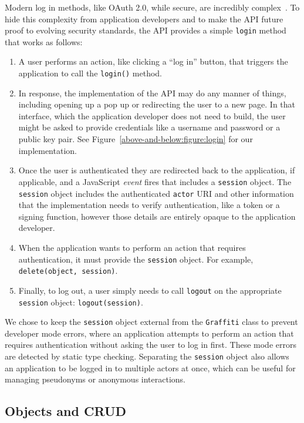 Modern log in methods, like OAuth 2.0, while secure, are incredibly complex~\cite{oauth}.
To hide this complexity from application developers and to make the API future proof
to evolving security standards, the API provides a simple \texttt{login} method that works as follows:

\begin{enumerate}
\item
A user performs an action, like clicking a ``log in'' button, that triggers
the application to call the \texttt{login()} method.
\item
In response, the implementation of the API may do any manner of things,
including opening up a pop up or redirecting the user to a new page.
In that  interface, which the application developer
does not need to build, the user might be asked to provide credentials like a username
and password or a public key pair.
See Figure~\ref{above-and-below:figure:login} for our implementation.
\item
Once the user is authenticated they are redirected back to the application, if applicable,
and a JavaScript \emph{event} fires that includes
a \texttt{session} object. The \texttt{session} object includes the authenticated \texttt{actor}
URI and other information that the implementation needs to verify authentication, like
a token or a signing function, however those details are entirely opaque to the application developer.
\item
When the application wants to perform an action that requires authentication,
it must provide the \texttt{session} object. For example,
\texttt{delete(object, session)}.
\item
Finally, to log out, a user simply needs to call \texttt{logout} on the appropriate
\texttt{session} object: \texttt{logout(session)}.
\end{enumerate}

We chose to keep the \texttt{session} object external from the \texttt{Graffiti} class
to prevent developer mode errors, where an application attempts to perform an action
that requires authentication without asking the user to log in first.
These mode errors are detected by static type checking.
Separating the \texttt{session} object also allows an application to be logged in to
multiple actors at once, which can be useful for managing pseudonyms or anonymous interactions.

\subsection{Objects and CRUD}

